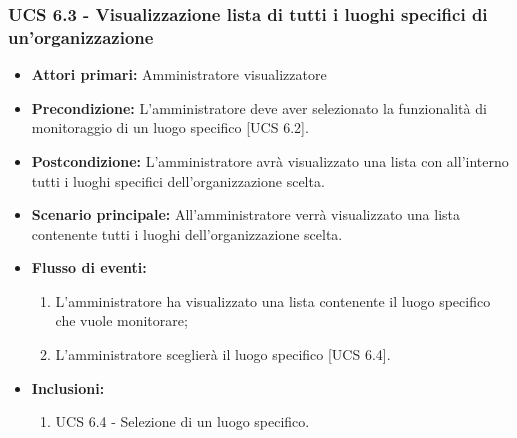 \subsubsection{UCS 6.3 - Visualizzazione lista di tutti i luoghi specifici di un'organizzazione}
\begin{itemize}
	\item \textbf{Attori primari:} Amministratore visualizzatore
	\item \textbf{Precondizione:} L'amministratore deve aver selezionato la funzionalità di monitoraggio di un luogo specifico [UCS 6.2].
	\item \textbf{Postcondizione:} L'amministratore avrà visualizzato una lista con all'interno tutti i luoghi specifici dell'organizzazione scelta.
	\item \textbf{Scenario principale:} All'amministratore verrà visualizzato una lista contenente tutti i luoghi dell'organizzazione scelta.
	\item \textbf{Flusso di eventi:} 
	\begin{enumerate}
		\item L'amministratore ha visualizzato una lista contenente il luogo specifico che vuole monitorare;
		\item L'amministratore sceglierà il luogo specifico [UCS 6.4].
	\end{enumerate}
	\item \textbf{Inclusioni:}
	\begin{enumerate}
		\item UCS 6.4 - Selezione di un luogo specifico.
	\end{enumerate}
\end{itemize}


